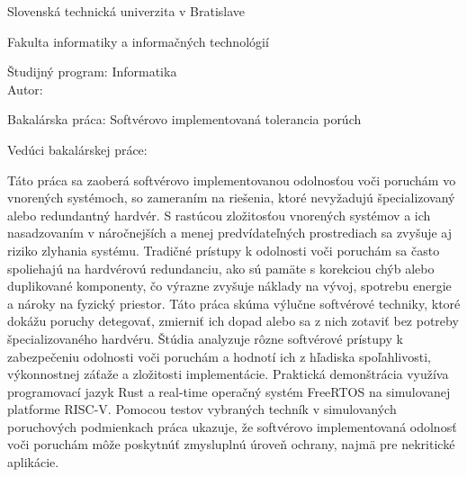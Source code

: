 \begin{minipage}[t]{1\columnwidth}%
Slovenská technická univerzita v Bratislave

Fakulta informatiky a informačných technológií

Študijný program: Informatika \\

Autor: \myName

Bakalárska práca: Softvérovo implementovaná tolerancia porúch

Vedúci bakalárskej práce: \mySupervisor

\myDate%
\end{minipage}

\bigskip{}

Táto práca sa zaoberá softvérovo implementovanou odolnosťou voči poruchám vo vnorených systémoch, so zameraním na riešenia, ktoré nevyžadujú špecializovaný alebo redundantný hardvér. S rastúcou zložitosťou vnorených systémov a ich nasadzovaním v náročnejších a menej predvídateľných prostrediach sa zvyšuje aj riziko zlyhania systému. Tradičné prístupy k odolnosti voči poruchám sa často spoliehajú na hardvérovú redundanciu, ako sú pamäte s korekciou chýb alebo duplikované komponenty, čo výrazne zvyšuje náklady na vývoj, spotrebu energie a nároky na fyzický priestor.
Táto práca skúma výlučne softvérové techniky, ktoré dokážu poruchy detegovať, zmierniť ich dopad alebo sa z nich zotaviť bez potreby špecializovaného hardvéru. Štúdia analyzuje rôzne softvérové prístupy k zabezpečeniu odolnosti voči poruchám a hodnotí ich z hľadiska spoľahlivosti, výkonnostnej záťaže a zložitosti implementácie. Praktická demonštrácia využíva programovací jazyk Rust a real-time operačný systém FreeRTOS na simulovanej platforme RISC-V. Pomocou testov vybraných techník v simulovaných poruchových podmienkach práca ukazuje, že softvérovo implementovaná odolnosť voči poruchám môže poskytnúť zmysluplnú úroveň ochrany, najmä pre nekritické aplikácie.

\clearpage


